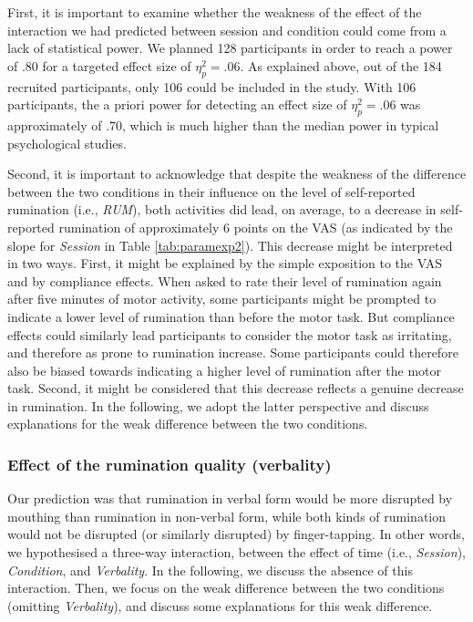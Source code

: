 \documentclass[a4paper,12pt,twoside,onecolumn,openright,final,oldfontcommands]{memoir}
\begin{document}
First, it is important to examine whether the weakness of the effect of the interaction we had predicted between session and condition could come from a lack of statistical power. We planned 128 participants in order to reach a power of .80 for a targeted effect size of \(\eta_{p}^{2}=.06\). As explained above, out of the 184 recruited participants, only 106 could be included in the study. With 106 participants, the a priori power for detecting an effect size of \(\eta_{p}^{2}=.06\) was approximately of .70, which is much higher than the median power in typical psychological studies.

Second, it is important to acknowledge that despite the weakness of the difference between the two conditions in their influence on the level of self-reported rumination (i.e., \emph{RUM}), both activities did lead, on average, to a decrease in self-reported rumination of approximately 6 points on the VAS (as indicated by the slope for \emph{Session} in Table \ref{tab:paramexp2}). This decrease might be interpreted in two ways. First, it might be explained by the simple exposition to the VAS and by compliance effects. When asked to rate their level of rumination again after five minutes of motor activity, some participants might be prompted to indicate a lower level of rumination than before the motor task. But compliance effects could similarly lead participants to consider the motor task as irritating, and therefore as prone to rumination increase. Some participants could therefore also be biased towards indicating a higher level of rumination after the motor task. Second, it might be considered that this decrease reflects a genuine decrease in rumination. In the following, we adopt the latter perspective and discuss explanations for the weak difference between the two conditions.

\hypertarget{effect-of-the-rumination-quality-verbality}{%
\subsubsection{Effect of the rumination quality (verbality)}\label{effect-of-the-rumination-quality-verbality}}

Our prediction was that rumination in verbal form would be more disrupted by mouthing than rumination in non-verbal form, while both kinds of rumination would not be disrupted (or similarly disrupted) by finger-tapping. In other words, we hypothesised a three-way interaction, between the effect of time (i.e., \emph{Session}), \emph{Condition}, and \emph{Verbality}. In the following, we discuss the absence of this interaction. Then, we focus on the weak difference between the two conditions (omitting \emph{Verbality}), and discuss some explanations for this weak difference.
\end{document}
